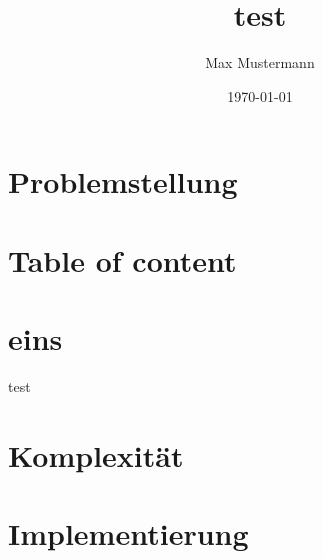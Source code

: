 \documentclass{beamer}
\title{test}
\author{Max Mustermann}
\date{\today}
\institute{Fachhochschule Trier}
\begin{document}
\maketitle

\section{Problemstellung}


\section*{Table of content}
\begin{frame}
	\tableofcontents
\end{frame}

\section{eins}
\begin{frame}
	test
\end{frame}


\section{Komplexität}


\section{Implementierung}

\end{document}
